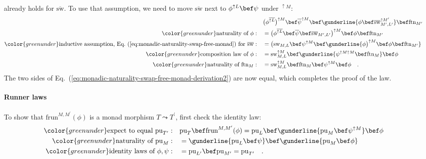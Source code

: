 already holds for $\overline{\text{sw}}$. To use that assumption,
we need to move $\overline{\text{sw}}$ next to $\phi^{\uparrow L}\bef\psi$
under $^{\uparrow M}$:
\begin{align*}
 & \big(\phi^{\overline{\uparrow L}}\big)^{\uparrow M}\bef\overline{\psi}^{\uparrow M}\bef\gunderline{\phi\bef\overline{\text{sw}}_{M^{\prime},L^{\prime}}^{\uparrow M^{\prime}}}\bef\text{ftn}_{M^{\prime}}\\
{\color{greenunder}\text{naturality of }\phi:}\quad & =\big(\phi^{\overline{\uparrow L}}\bef\overline{\psi}\bef\text{\ensuremath{\overline{\text{sw}}_{M^{\prime},L^{\prime}}}}\big)^{\uparrow M}\bef\phi\bef\text{ftn}_{M^{\prime}}\\
{\color{greenunder}\text{inductive assumption, Eq.~(\ref{eq:monadic-naturality-swap-free-monad}) for }\overline{\text{sw}}:}\quad & =\big(\text{sw}_{M,L}\bef\psi^{\uparrow M}\bef\gunderline{\phi\big)^{\uparrow M}\bef\phi\bef\text{ftn}_{M^{\prime}}}\\
{\color{greenunder}\text{composition law of }\phi:}\quad & =\text{sw}_{M,L}^{\uparrow M}\bef\gunderline{\psi^{\uparrow M\uparrow M}\bef\text{ftn}_{M}}\bef\phi\\
{\color{greenunder}\text{naturality of }\text{ftn}_{M}:}\quad & =\text{sw}_{M,L}^{\uparrow M}\bef\text{ftn}_{M}\bef\psi^{\uparrow M}\bef\phi\quad.
\end{align*}
The two sides of Eq.~(\ref{eq:monadic-naturality-swap-free-monad-derivation2})
are now equal, which completes the proof of the law.

\paragraph{Runner laws}

To show that $\text{frun}^{M,M^{\prime}}(\phi)$ is a monad morphism
$T\leadsto T^{\prime}$, first check the identity law:
\begin{align*}
{\color{greenunder}\text{expect to equal }\text{pu}_{T^{\prime}}:}\quad & \text{pu}_{T}\bef\text{frun}^{M,M^{\prime}}(\phi)=\text{pu}_{L}\bef\gunderline{\text{pu}_{M}\bef\psi^{\uparrow M}}\bef\phi\\
{\color{greenunder}\text{naturality of }\text{pu}_{M}:}\quad & =\gunderline{\text{pu}_{L}\bef\psi}\bef\gunderline{\text{pu}_{M}\bef\phi}\\
{\color{greenunder}\text{identity laws of }\phi,\psi:}\quad & =\text{pu}_{L^{\prime}}\bef\text{pu}_{M^{\prime}}=\text{pu}_{T^{\prime}}\quad.
\end{align*}

